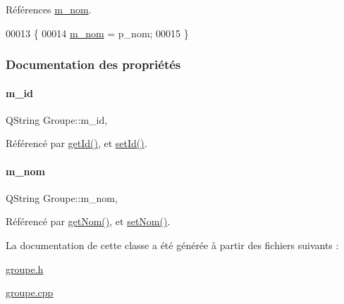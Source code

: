 Références \hyperlink{class_groupe_ad76b271599f46c8a350f8afa3bc884c5}{m\+\_\+nom}.


\begin{DoxyCode}
00013 \{
00014     \hyperlink{class_groupe_ad76b271599f46c8a350f8afa3bc884c5}{m\_nom} = p\_nom;
00015 \}
\end{DoxyCode}


\subsubsection{Documentation des propriétés}
\mbox{\label{class_groupe_ae837f3752cea27d8ab7678d4d1e4a764}} 
\paragraph{\texorpdfstring{m\+\_\+id}{m\_id}}
{\footnotesize\ttfamily Q\+String Groupe\+::m\+\_\+id\hspace{0.3cm}{\ttfamily [read]}, {\ttfamily [write]}}



Référencé par \hyperlink{class_groupe_aadab27e8d3f4a050a7bc4ae23c95efa7}{get\+Id()}, et \hyperlink{class_groupe_a3cb79da346bcd56dee1c8305050fde60}{set\+Id()}.

\mbox{\label{class_groupe_ad76b271599f46c8a350f8afa3bc884c5}} 
\paragraph{\texorpdfstring{m\+\_\+nom}{m\_nom}}
{\footnotesize\ttfamily Q\+String Groupe\+::m\+\_\+nom\hspace{0.3cm}{\ttfamily [read]}, {\ttfamily [write]}}



Référencé par \hyperlink{class_groupe_a88bf0b7a0e69d549fa3fdb1b01c0de2c}{get\+Nom()}, et \hyperlink{class_groupe_a44566810eab44cd98be317f4d803a45e}{set\+Nom()}.



La documentation de cette classe a été générée à partir des fichiers suivants \+:\begin{DoxyCompactItemize}
\item 
\hyperlink{groupe_8h}{groupe.\+h}\item 
\hyperlink{groupe_8cpp}{groupe.\+cpp}\end{DoxyCompactItemize}
